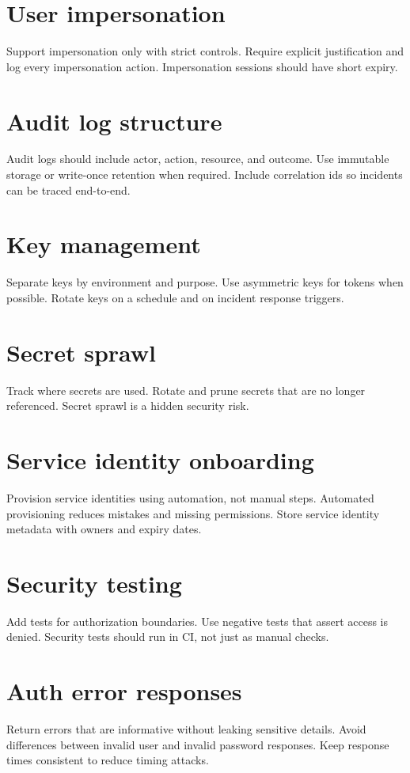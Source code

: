 \section{User impersonation}
Support impersonation only with strict controls.
Require explicit justification and log every impersonation action.
Impersonation sessions should have short expiry.

\section{Audit log structure}
Audit logs should include actor, action, resource, and outcome.
Use immutable storage or write-once retention when required.
Include correlation ids so incidents can be traced end-to-end.

\section{Key management}
Separate keys by environment and purpose.
Use asymmetric keys for tokens when possible.
Rotate keys on a schedule and on incident response triggers.

\section{Secret sprawl}
Track where secrets are used.
Rotate and prune secrets that are no longer referenced.
Secret sprawl is a hidden security risk.

\section{Service identity onboarding}
Provision service identities using automation, not manual steps.
Automated provisioning reduces mistakes and missing permissions.
Store service identity metadata with owners and expiry dates.

\section{Security testing}
Add tests for authorization boundaries.
Use negative tests that assert access is denied.
Security tests should run in CI, not just as manual checks.

\section{Auth error responses}
Return errors that are informative without leaking sensitive details.
Avoid differences between invalid user and invalid password responses.
Keep response times consistent to reduce timing attacks.

